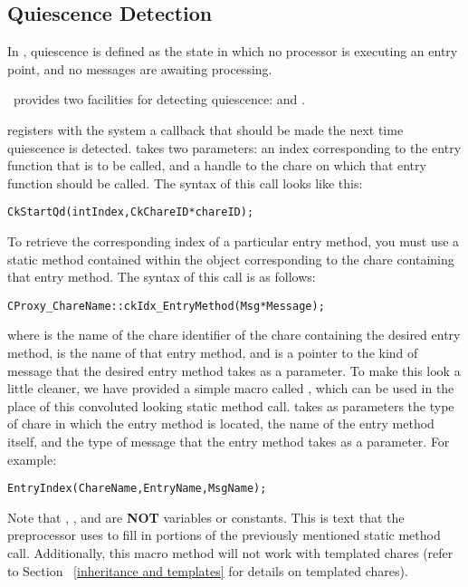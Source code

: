 \subsection{Quiescence Detection}

In \charmpp, quiescence is defined as the state in which no
processor is executing an entry point, and no messages are awaiting processing.

\charmpp\ provides two facilities for detecting quiescence:  and
.

 registers with the system a callback that should be made the
next time quiescence is detected.   takes two
parameters: an index corresponding to the entry function that is to be called,
and a handle to the chare on which that entry function should be called.  The
syntax of this call looks like this:

\begin{alltt}
 CkStartQd(int Index, CkChareID* chareID);
\end{alltt}

To retrieve the corresponding index of a particular entry
method, you must use a static method contained within the  object
corresponding to the chare containing that entry method.  The
syntax of this call is as follows:

\begin{alltt}
CProxy_ChareName::ckIdx_EntryMethod(Msg *Message);
\end{alltt}

where  is the name of the chare identifier of the chare containing
the desired entry method,  is the name of that entry method,
and  is a pointer to the kind of message that the desired entry
method takes as a parameter. To make this look a little cleaner, we have
provided a simple macro called , which can be used in the place
of this convoluted looking static method call.   takes as
parameters the type of chare in which the entry method is located, the name of
the entry method itself, and the type of message that the entry method takes as
a parameter. For example:

\begin{alltt}
 EntryIndex(ChareName, EntryName, MsgName);
\end{alltt}

Note that , , and  are {\bf NOT}
variables or constants. This is text that the preprocessor uses to fill in
portions of the previously mentioned static method call.  Additionally, this
macro method will not work with templated chares (refer to Section
~\ref{inheritance and templates} for details on templated chares).

